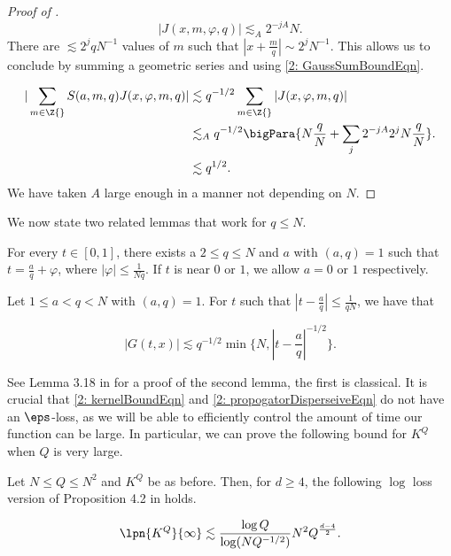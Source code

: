 \documentclass[11pt]{amsart}
\begin{document}
\begin{proof}[Proof of ]
    \begin{equation*}
        |J(x,m,\varphi,q)|\lesssim_A 2^{-jA}N.
    \end{equation*}
    There are $\lesssim 2^jqN^{-1}$ values of $m$ such that $|x+\frac{m}{q}|\sim 2^j N^{-1}$. This allows us to conclude by summing a geometric series and using \eqref{2: GaussSumBoundEqn}.

    \begin{align*}
        |\sum_{m\in\Z{}}S(a,m,q)J(x,\varphi,m,q)|&\lesssim q^{-1/2}\sum_{m\in\Z{}}|J(x,\varphi,m,q)| \\
        &\lesssim_A q^{-1/2}\bigPara{N\frac{q}{N}+\sum_{j}2^{-jA}2^{j}N\frac{q}{N}}.\\
        &\lesssim q^{1/2}.
    \end{align*}
    We have taken $A$ large enough in a manner not depending on $N$.
\end{proof}
\noindent
We now state two related lemmas that work for $q\leq N$. 

\begin{lemma}\label{2: dirichlet'sLemma}
    For every $t\in[0,1]$, there exists a $2\leq q \leq N$ and $a$ with $(a,q)=1$ such that $t = \frac{a}{q}+\varphi$, where $|\varphi|\leq \frac{1}{Nq}$. If $t$ is near $0$ or $1$, we allow $a=0$ or $1$ respectively.
\end{lemma}

\begin{lemma}\label{2: propogatorDisperseiveLemma}
Let $1\leq a < q <N$ with $(a,q)=1$. For $t$ such that $|t- \frac{a}{q}|\leq \frac{1}{qN}$, we have that

\begin{equation}\label{2: propogatorDisperseiveEqn}
    |G(t,x)|\lesssim q^{-1/2}\min \{N, |t-\frac{a}{q}|^{-1/2}\}.
\end{equation}
\end{lemma}
See Lemma 3.18 in \cite{BourgainGAFALattice11993} for a proof of the second lemma, the first is classical. It is crucial that \eqref{2: kernelBoundEqn} and \eqref{2: propogatorDisperseiveEqn} do not have an $\eps$-loss, as we will be able to efficiently control the amount of time our function can be large. In particular, we can prove the following bound for $K^Q$ when $Q$ is very large. 

\begin{proposition}\label{2: KQSpaceBoundProp}
    Let $N\leq Q\leq N^2$ and $K^Q$ be as before. Then, for $d\geq 4$, the following $\log$ loss version of Proposition 4.2 in \cite{bourgainDemeterDiscreteRestrictImprovements2013} holds.

    \begin{equation}\label{2: KQSpaceBoundEqn}
        \lpn{K^Q}{\infty}\lesssim \frac{\log Q}{\log(NQ^{-1/2})} N^2 Q^{\frac{d-4}{2}}.
    \end{equation}
\end{proposition}
\end{document}
